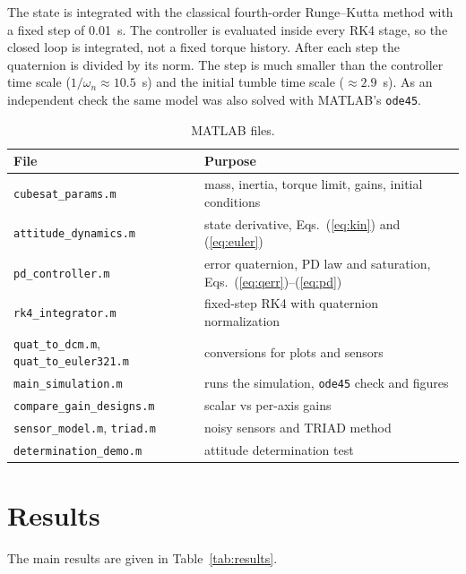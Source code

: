\documentclass[letterpaper,10pt]{article}
\begin{document}
The state is integrated with the classical fourth-order Runge--Kutta method
with a fixed step of 0.01~s. The controller is evaluated inside every RK4
stage, so the closed loop is integrated, not a fixed torque history. After
each step the quaternion is divided by its norm. The step is much smaller
than the controller time scale ($1/\omega_n \approx 10.5$~s) and the initial
tumble time scale ($\approx 2.9$~s). As an independent check the same model
was also solved with MATLAB's \texttt{ode45}.

\begin{table}[htbp]
\centering
\caption{MATLAB files.}
\label{tab:files}
\begin{tabular}{@{}ll@{}}
\toprule
File & Purpose \\
\midrule
\texttt{cubesat\_params.m} & mass, inertia, torque limit, gains, initial conditions \\
\texttt{attitude\_dynamics.m} & state derivative, Eqs.~(\ref{eq:kin}) and (\ref{eq:euler}) \\
\texttt{pd\_controller.m} & error quaternion, PD law and saturation, Eqs.~(\ref{eq:qerr})--(\ref{eq:pd}) \\
\texttt{rk4\_integrator.m} & fixed-step RK4 with quaternion normalization \\
\texttt{quat\_to\_dcm.m}, \texttt{quat\_to\_euler321.m} & conversions for plots and sensors \\
\texttt{main\_simulation.m} & runs the simulation, \texttt{ode45} check and figures \\
\texttt{compare\_gain\_designs.m} & scalar vs per-axis gains \\
\texttt{sensor\_model.m}, \texttt{triad.m} & noisy sensors and TRIAD method \\
\texttt{determination\_demo.m} & attitude determination test \\
\bottomrule
\end{tabular}
\end{table}

\section{Results}

The main results are given in Table~\ref{tab:results}.
\end{document}

